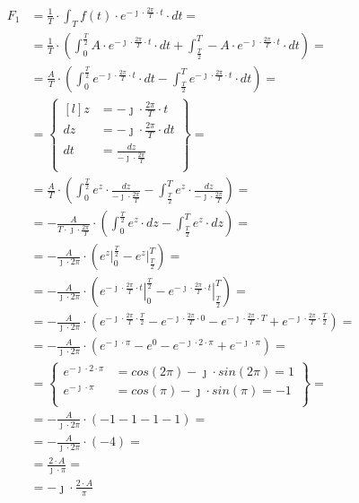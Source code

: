 \begin{task}
\begin{align*}
F_1&=\frac{1}{T} \cdot \int_{T}f(t) \cdot e^{-\jmath \cdot \frac{2\pi}{T} \cdot t} \cdot dt=\\
&=\frac{1}{T} \cdot \left(\int_{0}^{\frac{T}{2}}A \cdot e^{-\jmath \cdot \frac{2\pi}{T} \cdot t} \cdot dt + \int_{\frac{T}{2}}^{T}-A \cdot e^{-\jmath \cdot \frac{2\pi}{T} \cdot t} \cdot dt\right)=\\
&=\frac{A}{T} \cdot \left(\int_{0}^{\frac{T}{2}}e^{-\jmath \cdot \frac{2\pi}{T} \cdot t} \cdot dt - \int_{\frac{T}{2}}^{T}e^{-\jmath \cdot \frac{2\pi}{T} \cdot t} \cdot dt\right)=\\
&=\begin{Bmatrix*}[l]
z&=-\jmath \cdot \frac{2\pi}{T} \cdot t\\
dz&=-\jmath \cdot \frac{2\pi}{T} \cdot dt\\
dt&=\frac{dz}{-\jmath \cdot \frac{2\pi}{T}}\\
\end{Bmatrix*}=\\
&=\frac{A}{T} \cdot \left(\int_{0}^{\frac{T}{2}} e^{z} \cdot \frac{dz}{-\jmath \cdot \frac{2\pi}{T}}-\int_{\frac{T}{2}}^{T} e^{z} \cdot \frac{dz}{-\jmath \cdot \frac{2\pi}{T}}\right)=\\
&=-\frac{A}{T \cdot \jmath \cdot \frac{2\pi}{T}} \cdot \left(\int_{0}^{\frac{T}{2}} e^{z} \cdot dz - \int_{\frac{T}{2}}^{T} e^{z} \cdot dz\right)=\\
&=-\frac{A}{\jmath \cdot 2 \pi} \cdot \left(\left. e^{z} \right|_{0}^{\frac{T}{2}} - \left. e^{z} \right|_{\frac{T}{2}}^{T}\right)=\\
&=-\frac{A}{\jmath \cdot 2 \pi} \cdot \left(\left. e^{-\jmath \cdot \frac{2\pi}{T} \cdot t} \right|_{0}^{\frac{T}{2}} - \left. e^{-\jmath \cdot \frac{2\pi}{T} \cdot t} \right|_{\frac{T}{2}}^{T}\right)=\\
&=-\frac{A}{\jmath \cdot 2 \pi} \cdot \left( e^{-\jmath \cdot \frac{2\pi}{T} \cdot \frac{T}{2}} - e^{-\jmath \cdot \frac{2\pi}{T} \cdot 0} -e^{-\jmath \cdot \frac{2\pi}{T} \cdot T} + e^{-\jmath \cdot \frac{2\pi}{T} \cdot \frac{T}{2}}\right)=\\
&=-\frac{A}{\jmath \cdot 2 \pi} \cdot \left( e^{ -\jmath \cdot \pi } - e^{ 0} - e^{ -\jmath \cdot 2 \cdot \pi}+e^{ -\jmath \cdot \pi }\right)=\\
&=\begin{Bmatrix}
e^{ -\jmath \cdot 2\cdot \pi }&=cos(2\pi)-\jmath \cdot sin(2\pi)=1\\
e^{ -\jmath \cdot \pi }&=cos(\pi)-\jmath \cdot sin(\pi)=-1\\
\end{Bmatrix}=\\
&=-\frac{A}{\jmath \cdot 2 \pi} \cdot \left( -1 - 1 - 1 -1\right)=\\
&=-\frac{A}{\jmath \cdot 2 \pi} \cdot \left( -4\right)=\\
&=\frac{2 \cdot A}{\jmath \cdot \pi}=\\
&=-\jmath \cdot \frac{2 \cdot A}{\pi}
\end{align*}


\end{task}

